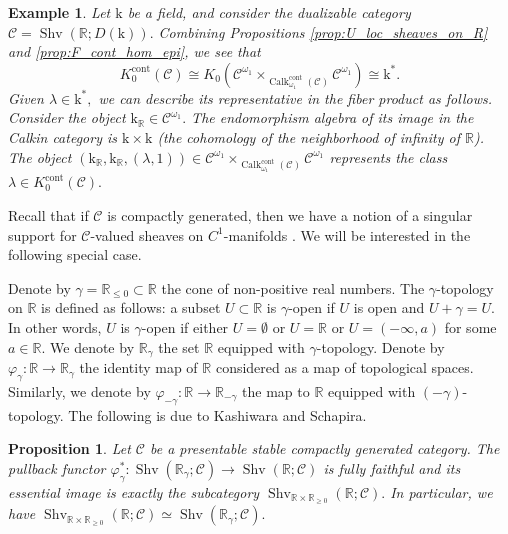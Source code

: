 \documentclass[11pt,leqno]{amsart}
\newtheorem{prop}[theo]{Proposition}
\newtheorem{example}[theo]{Example}
\numberwithin{equation}{section}
\def\R{\mathbb{R}}
\newcommand{\cont}{\operatorname{cont}}
\newcommand{\mk}{\mathrm k}
\newcommand{\cC}{{\mathcal C}}
\newcommand{\Sh}{\operatorname{Shv}}
\newcommand{\Sp}{\operatorname{Sp}}
\newcommand{\Calk}{\operatorname{Calk}}
\begin{document}
\begin{example}Let $\mk$ be a field, and consider the dualizable category $\cC=\Sh(\R;D(\mk)).$ Combining Propositions \ref{prop:U_loc_sheaves_on_R} and \ref{prop:F_cont_hom_epi}, we see that $$K_0^{\cont}(\cC)\cong K_0(\cC^{\omega_1}\times_{\Calk_{\omega_1}^{\cont}(\cC)}\cC^{\omega_1})\cong\mk^{\ast}.$$ Given $\lambda\in \mk^{\ast},$ we can describe its representative in the fiber product as follows. Consider the object $\mk_{\R}\in\cC^{\omega_1}.$ The endomorphism algebra of its image in the Calkin category is $\mk\times\mk$ (the cohomology of the neighborhood of infinity of $\R$). The object $(\mk_{\R},\mk_{\R},(\lambda,1))\in \cC^{\omega_1}\times_{\Calk_{\omega_1}^{\cont}(\cC)}\cC^{\omega_1}$ represents the class $\lambda\in K_0^{\cont}(\cC).$\end{example}


Recall that if $\cC$ is compactly generated, then we have a notion of a singular support for $\cC$-valued sheaves on $C^1$-manifolds \cite[Definition 4.5]{RS}. We will be interested in the following special case.

Denote by $\gamma=\R_{\leq 0}\subset \R$ the cone of non-positive real numbers. The $\gamma$-topology on $\R$ is defined as follows: a subset $U\subset\R$ is $\gamma$-open if $U$ is open and $U+\gamma=U.$ In other words, $U$ is $\gamma$-open if either $U=\emptyset$ or $U=\R$ or $U=(-\infty,a)$ for some $a\in\R.$ We denote by $\R_{\gamma}$ the set $\R$ equipped with $\gamma$-topology. Denote by $\varphi_{\gamma}:\R\to\R_{\gamma}$ the identity map of $\R$ considered as a map of topological spaces. Similarly, we denote by $\varphi_{-\gamma}:\R\to\R_{-\gamma}$ the map to $\R$ equipped with $(-\gamma)$-topology. The following is due to Kashiwara and Schapira.

\begin{prop}\cite{KS18} Let $\cC$ be a presentable stable compactly generated category. The pullback functor $\varphi_{\gamma}^*:\Sh(\R_{\gamma};\cC)\to\Sh(\R;\cC)$ is fully faithful and its essential image is exactly the subcategory $\Sh_{\R\times\R_{\geq 0}}(\R;\cC).$ In particular, we have $\Sh_{\R\times\R_{\geq 0}}(\R;\cC)\simeq \Sh(\R_{\gamma};\cC).$
\end{prop}
\end{document}
